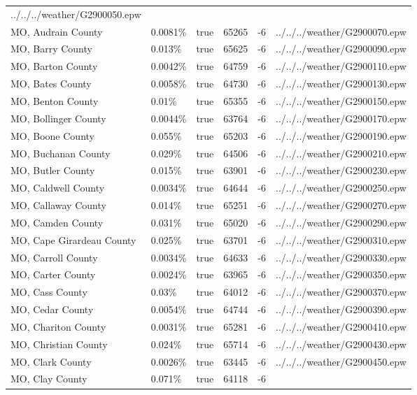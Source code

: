 \begin{longtable}[]{@{}llllll@{}}
../../../weather/G2900050.epw \\
MO, Audrain County & 0.0081\% & true & 65265 & -6 &
../../../weather/G2900070.epw \\
MO, Barry County & 0.013\% & true & 65625 & -6 &
../../../weather/G2900090.epw \\
MO, Barton County & 0.0042\% & true & 64759 & -6 &
../../../weather/G2900110.epw \\
MO, Bates County & 0.0058\% & true & 64730 & -6 &
../../../weather/G2900130.epw \\
MO, Benton County & 0.01\% & true & 65355 & -6 &
../../../weather/G2900150.epw \\
MO, Bollinger County & 0.0044\% & true & 63764 & -6 &
../../../weather/G2900170.epw \\
MO, Boone County & 0.055\% & true & 65203 & -6 &
../../../weather/G2900190.epw \\
MO, Buchanan County & 0.029\% & true & 64506 & -6 &
../../../weather/G2900210.epw \\
MO, Butler County & 0.015\% & true & 63901 & -6 &
../../../weather/G2900230.epw \\
MO, Caldwell County & 0.0034\% & true & 64644 & -6 &
../../../weather/G2900250.epw \\
MO, Callaway County & 0.014\% & true & 65251 & -6 &
../../../weather/G2900270.epw \\
MO, Camden County & 0.031\% & true & 65020 & -6 &
../../../weather/G2900290.epw \\
MO, Cape Girardeau County & 0.025\% & true & 63701 & -6 &
../../../weather/G2900310.epw \\
MO, Carroll County & 0.0034\% & true & 64633 & -6 &
../../../weather/G2900330.epw \\
MO, Carter County & 0.0024\% & true & 63965 & -6 &
../../../weather/G2900350.epw \\
MO, Cass County & 0.03\% & true & 64012 & -6 &
../../../weather/G2900370.epw \\
MO, Cedar County & 0.0054\% & true & 64744 & -6 &
../../../weather/G2900390.epw \\
MO, Chariton County & 0.0031\% & true & 65281 & -6 &
../../../weather/G2900410.epw \\
MO, Christian County & 0.024\% & true & 65714 & -6 &
../../../weather/G2900430.epw \\
MO, Clark County & 0.0026\% & true & 63445 & -6 &
../../../weather/G2900450.epw \\
MO, Clay County & 0.071\% & true & 64118 & -6 &

\end{longtable}
